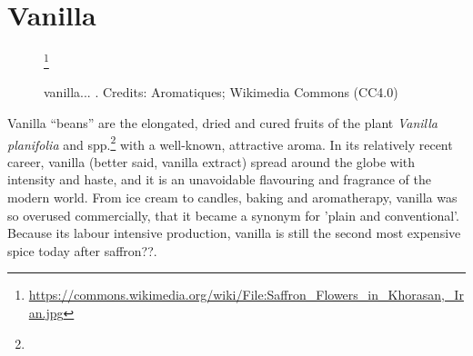 \section{Vanilla}
\label{sec:vanilla}



\begin{figure}[!ht]
	\vspace{-4ex}
	\centering
	\hfill
	\hfill
	\caption{vanilla... . Credits: Aromatiques; Wikimedia Commons (CC4.0)}\footnote{\url{https://commons.wikimedia.org/wiki/File:Saffron_Flowers_in_Khorasan,_Iran.jpg}}
	\label{fig:vanilla_imgs}
\end{figure}




Vanilla ``beans'' are the elongated, dried and cured fruits of the plant \textit{Vanilla planifolia} and spp.\footnote{} with a well-known, attractive aroma. In its relatively recent career, vanilla (better said, vanilla extract) spread around the globe with intensity and haste, and it is an unavoidable flavouring and fragrance of the modern world. From ice cream to candles, baking and aromatherapy, vanilla was so overused commercially, that it became a synonym for 'plain and conventional'. Because its labour intensive production, vanilla is still the second most expensive spice today after saffron??.

